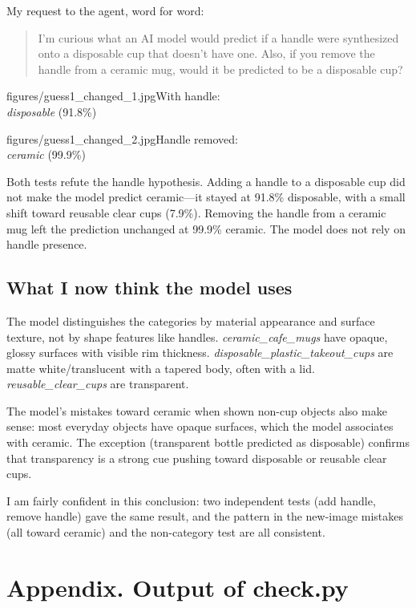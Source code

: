 \documentclass[11pt]{article}
\begin{document}
My request to the agent, word for word:
\begin{quote}
I'm curious what an AI model would predict if a handle were synthesized onto a disposable cup that doesn't have one. Also, if you remove the handle from a ceramic mug, would it be predicted to be a disposable cup?
\end{quote}

           {figures/guess1_changed_1.jpg}{With handle:\\ \emph{disposable} (91.8\%)}

           {figures/guess1_changed_2.jpg}{Handle removed:\\ \emph{ceramic} (99.9\%)}

Both tests refute the handle hypothesis. Adding a handle to a disposable cup did not make the model predict ceramic---it stayed at 91.8\% disposable, with a small shift toward reusable clear cups (7.9\%). Removing the handle from a ceramic mug left the prediction unchanged at 99.9\% ceramic. The model does not rely on handle presence.

\subsection*{What I now think the model uses}

The model distinguishes the categories by material appearance and surface texture, not by shape features like handles. \emph{ceramic\_cafe\_mugs} have opaque, glossy surfaces with visible rim thickness. \emph{disposable\_plastic\_takeout\_cups} are matte white/translucent with a tapered body, often with a lid. \emph{reusable\_clear\_cups} are transparent.

The model's mistakes toward ceramic when shown non-cup objects also make sense: most everyday objects have opaque surfaces, which the model associates with ceramic. The exception (transparent bottle predicted as disposable) confirms that transparency is a strong cue pushing toward disposable or reusable clear cups.

I am fairly confident in this conclusion: two independent tests (add handle, remove handle) gave the same result, and the pattern in the new-image mistakes (all toward ceramic) and the non-category test are all consistent.

\section*{Appendix. Output of check.py}
\end{document}
